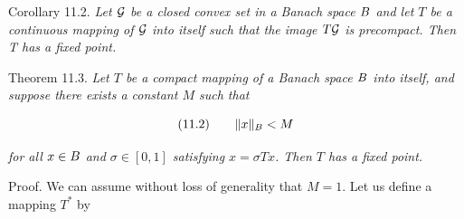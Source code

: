 
\begin{corollary}
\label{gt-cor-11-2}
Corollary 11.2. \emph{Let $\mathcal{G}$ be a closed convex set in a Banach space $B$ and let $T$ be a
continuous mapping of $\mathcal{G}$ into itself such that the image $T\mathcal{G}$ is precompact. Then T has
a fixed point.}
\end{corollary}

\begin{theorem}
\label{gt-thm-11-3}
Theorem 11.3. \emph{Let $T\!$ be a compact mapping of a Banach space $B$ into itself, and
suppose there exists a constant $M$ such that}

\[(11.2)\qquad \|x\|_{B} < M\]

\emph{for all $x \in B$ and $\sigma \in [0,1]$ satisfying $x = \sigma Tx$. Then $T$ has a fixed point.}

Proof. We can assume without loss of generality that $M = 1$. Let us define a
mapping $T^*$ by
\end{theorem}
